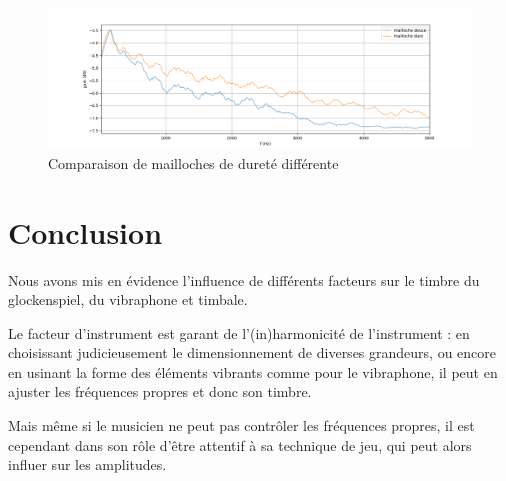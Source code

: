 \documentclass[atiam, article]{rapport} %
\begin{document}
\begin{figure}
  \begin{center}
    \includegraphics[width=\textwidth]{percu/timbale-soft-hard.png}
  \end{center}
  \caption{Comparaison de mailloches de dureté différente}
  \label{fig:timb-soft-hard}
\end{figure}

\section{Conclusion}

Nous avons mis en évidence l'influence de différents facteurs sur le timbre du glockenspiel, du vibraphone et timbale.

Le facteur d'instrument est garant de l'(in)harmonicité de l'instrument : en choisissant judicieusement le dimensionnement de diverses grandeurs, ou encore en usinant la forme des éléments vibrants comme pour le vibraphone, il peut en ajuster les fréquences propres et donc son timbre.

Mais même si le musicien ne peut pas contrôler les fréquences propres, il est cependant dans son rôle d'être attentif à sa technique de jeu, qui peut alors influer sur les amplitudes.

\printbibliography
\end{document}
